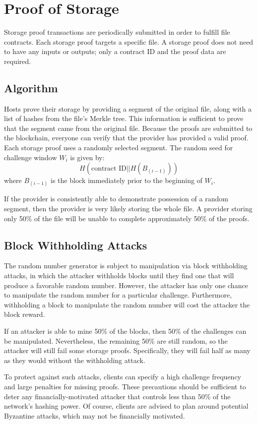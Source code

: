\documentclass[twocolumn]{article}
\begin{document}
\section{Proof of Storage}
\label{sec:storage}
Storage proof transactions are periodically submitted in order to fulfill file contracts.
Each storage proof targets a specific file. %
A storage proof does not need to have any inputs or outputs; only a contract ID and the proof data are required.

\subsection{Algorithm}
Hosts prove their storage by providing a segment of the original file, along with a list of hashes from the file's Merkle tree.
This information is sufficient to prove that the segment came from the original file.
Because the proofs are submitted to the blockchain, everyone can verify that the provider has provided a valid proof.
Each storage proof uses a randomly selected segment.
The random seed for challenge window $W_i$ is given by:
\[
	H(\text{contract ID} || H(B_(i-1)))
\]
where $B_(i-1)$ is the block immediately prior to the beginning of $W_i$.

If the provider is consistently able to demonstrate possession of a random segment, then the provider is very likely storing the whole file.
A provider storing only 50\% of the file will be unable to complete approximately 50\% of the proofs.

\subsection{Block Withholding Attacks}
The random number generator is subject to manipulation via block withholding attacks, in which the attacker withholds blocks until they find one that will produce a favorable random number.
However, the attacker has only one chance to manipulate the random number for a particular challenge.
Furthermore, withholding a block to manipulate the random number will cost the attacker the block reward.

If an attacker is able to mine 50\% of the blocks, then 50\% of the challenges can be manipulated.
Nevertheless, the remaining 50\% are still random, so the attacker will still fail some storage proofs.
Specifically, they will fail half as many as they would without the withholding attack.

To protect against such attacks, clients can specify a high challenge frequency and large penalties for missing proofs.
These precautions should be sufficient to deter any financially-motivated attacker that controls less than 50\% of the network's hashing power.
Of course, clients are advised to plan around potential Byzantine attacks, which may not be financially motivated.
\end{document}
